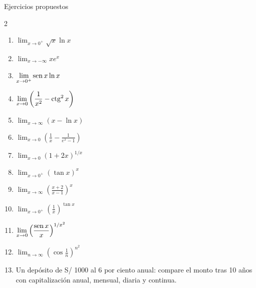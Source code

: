 \documentclass[10pt,aspectratio=169]{beamer}
\begin{document}
\begin{frame}{Ejercicios propuestos}
  \small
  \begin{ejercicio}
    \begin{multicols}{2}
    \begin{enumerate}
      \item $\displaystyle\lim_{x\to0^+}\sqrt x\ln x$
      \item $\displaystyle\lim_{x\to-\infty}xe^x$
      \item $\displaystyle\lim_{x\to0^+}\operatorname{sen} x\ln x$
      \item $\displaystyle\lim_{x\to0}\left(\frac1{x^2}-\operatorname{ctg}^2x\right)$
      \item $\displaystyle\lim_{x\to\infty}\left(x-\ln x\right)$
      \item $\displaystyle\lim_{x\to0}\left(\frac1x-\frac1{e^x-1}\right)$
      \item $\displaystyle\lim_{x\to0}(1+2x)^{1/x}$
      \item $\displaystyle\lim_{x\to0^+}(\tan x)^{x}$
      \item $\displaystyle\lim_{x\to\infty}\left(\frac{x+2}{x-1}\right)^{x}$
      \item $\displaystyle\lim_{x\to0^+}\left(\frac1x\right)^{\tan x}$
      \item $\displaystyle\lim_{x\to0}\left(\frac{\operatorname{sen} x}{x}\right)^{1/x^2}$
      \item $\displaystyle\lim_{n\to\infty}\left(\cos\frac1n\right)^{n^2}$
    \end{enumerate}
    \end{multicols}
  \end{ejercicio}
  \begin{ejercicio}[: aplicación]
    \begin{enumerate}
      \setcounter{enumi}{12}
      \item Un depósito de S/ 1000 al 6 por ciento anual: compare el monto tras 10 años con capitalización anual, mensual, diaria y continua.
    \end{enumerate}
  \end{ejercicio}
\end{frame}
\end{document}
